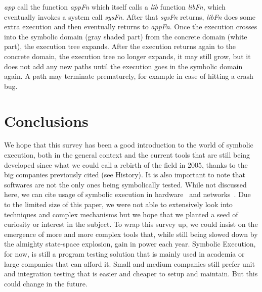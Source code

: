 \documentclass[11pt]{IEEEtran}
\begin{document}
    		\emph{app} call the function \emph{appFn} which itself calls a \emph{lib} function \emph{libFn}, which eventually invokes a system call \emph{sysFn}. After that \emph{sysFn} returns, \emph{libFn} does some extra execution and then eventually returns to \emph{appFn}. Once the execution crosses into the symbolic domain (gray shaded part) from the concrete domain (white part), the execution tree expands. After the execution returns again to the concrete domain, the execution tree no longer expands, it may still grow, but it does not add any new paths until the execution goes in the symbolic domain again. A path may terminate prematurely, for example in case of hitting a crash bug.



  \section{Conclusions}
    We hope that this survey has been a good introduction to the world of symbolic execution, both in the general context and the current tools that are still being developed since what we could call a rebirth of the field in 2005, thanks to the big companies previously cited (see History). It is also important to note that softwares are not the only ones being symbolically tested. While not discussed here, we can cite usage of symbolic execution in hardware~\cite{Hardware} and networks~\cite{220590}. Due to the limited size of this paper, we were not able to extensively look into techniques and complex mechanisms but we hope that we planted a seed of curiosity or interest in the subject. To wrap this survey up, we could insist on the emergence of more and more complex tools that, while still being slowed down by the almighty state-space explosion, gain in power each year. Symbolic Execution, for now, is still a program testing solution that is mainly used in academia or large companies that can afford it. Small and medium companies still prefer unit and integration testing that is easier and cheaper to setup and maintain. But this could change in the future.\hfill %



\pagebreak
{}

\end{document}
